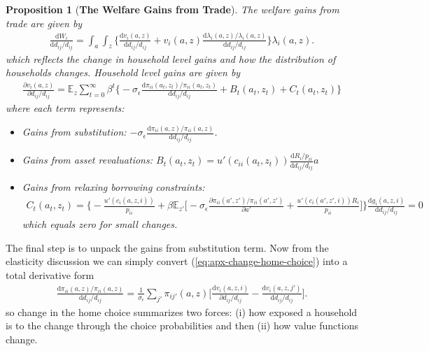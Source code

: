 \documentclass[12pt,pdftex]{article}
\newtheorem{prp}{Proposition}
\begin{document}
\begin{onehalfspacing}
\begin{prp}[\textbf{The Welfare Gains from Trade}] \label{apx-prp:gains-trade} The welfare gains from trade are given by
{\footnotesize
\begin{align}
\frac{\mathrm{d} W_{i}}{\mathrm{d} d_{ij} / d_{ij}} = \int_{a}\int_{z}  \bigg \{ \frac{\mathrm{d} v_i(a, z)}{\mathrm{d} d_{ij} / d_{ij}}  + v_{i}(a,z) \frac{\mathrm{d} \lambda_{i}(a,z)/ \lambda_{i}(a,z)}{\mathrm{d} d_{ij} / d_{ij}}  \bigg \} \lambda_{i}(a,z).
\nonumber
\end{align}
}which reflects the change in household level gains and how the distribution of households changes. Household level gains are given by
{\footnotesize
\begin{align}
\nonumber
\frac{\partial v_i(a, z)}{\partial d_{ij} / d_{ij}} = \mathbb{E}_{z} \sum_{t = 0}^{\infty} \beta^{t} \bigg \{ -\sigma_{\epsilon} \frac{\mathrm{d} \pi_{ii}(a_{t},z_{t}) / \pi_{ii}(a_{t},z_{t})}{\mathrm{d}d_{ij} / d_{ij}} + B_{t}(a_{t},z_{t}) + C_{t}(a_{t},z_{t}) \bigg \}
\end{align}
}where each term represents:
\begin{itemize}
\item Gains from substitution: $-\sigma_{\epsilon} \frac{\mathrm{d} \pi_{ii}(a,z) / \pi_{ii}(a,z)}{\mathrm{d}d_{ij} / d_{ij}}$.

\item Gains from asset revaluations: $B_{t}(a_{t},z_{t}) = u'(c_{ii}(a_{t},z_{t}))\frac{\mathrm{d} R_{i}/p_{ii}}{\mathrm{d} d_{ij} / d_{ij}}a$

\item Gains from relaxing borrowing constraints:
{\footnotesize
\begin{align}
\nonumber
C_{t}(a_{t},z_{t}) = \bigg \{- \frac{u'(c_{i}(a,z,i))}{p_{ii}} + \beta \mathbb{E}_{z'} \bigg [-\sigma_{\epsilon} \frac{\partial \pi_{ii}(a',z') / \pi_{ii}(a',z')}{\partial a'} + \frac{u'(c_{i}(a',z',i))R_{i}}{p_{ii}} \bigg ] \bigg \}\frac{\mathrm{d} g_{i}(a,z,i)}{\mathrm{d} d_{ij} / d_{ij}} = 0
\end{align}}
which equals zero for small changes.
\end{itemize}
\end{prp}


The final step is to unpack the gains from substitution term. Now from the elasticity discussion we can simply convert (\ref{eq:apx-change-home-choice}) into a total derivative form
\begin{align}
\frac{\mathrm{d} \pi_{ii}(a,z) / \pi_{ii}(a,z) }{\mathrm{d} d_{ij} / d_{ij}} = \frac{1}{\sigma_{\epsilon}} \sum_{j'} \pi_{ij'}(a,z) \bigg[ \frac{\mathrm{d} v_{i}(a,z,i)}{\partial d_{ij}/d_{ij}} - \frac{\mathrm{d} v_{i}(a,z,j')}{\mathrm{d} d_{ij}/d_{ij}} \bigg].
\label{apx-eq:homechoice-total}
\end{align}
so change in the home choice summarizes two forces: (i) how exposed a household is to the change through the choice probabilities and then (ii) how value functions change.


\end{onehalfspacing}
\end{document}
